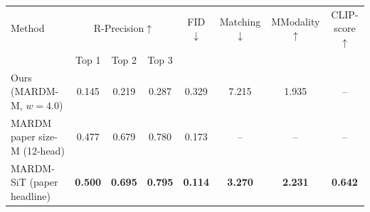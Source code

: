 {\renewcommand{\arraystretch}{1.7}%
\setlength{\tabcolsep}{12pt}%
\begin{tabular}{l|ccc|c|c|c|c}
\hline\hline
Method & \multicolumn{3}{c|}{R-Precision$\uparrow$} & FID$\downarrow$ & Matching$\downarrow$ & MModality$\uparrow$ & CLIP-score$\uparrow$ \\
\cline{2-4}
 & Top 1 & Top 2 & Top 3 & & & & \\
\hline
Ours (MARDM-M, $w{=}4.0$)      & 0.145 & 0.219 & 0.287 & 0.329 & 7.215 & 1.935 & -- \\
MARDM paper size-M (12-head)    & 0.477 & 0.679 & 0.780 & 0.173 & --    & --    & -- \\
MARDM-SiT (paper headline)      & \textbf{0.500} & \textbf{0.695} & \textbf{0.795} & \textbf{0.114} & \textbf{3.270} & \textbf{2.231} & \textbf{0.642} \\
\hline\hline
\end{tabular}}
